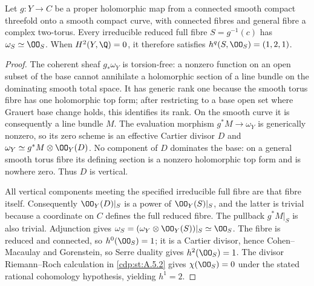 
\begin{proposition}\label{cdp:st:A.4.4}
Let $g:Y\to C$ be a proper holomorphic map from a connected smooth compact threefold onto a smooth compact curve, with connected fibres and general fibre a complex two-torus. Every irreducible reduced full fibre $S=g^{-1}(c)$ has $\omega_S\simeq\OO_S$. When $H^2(Y,\Q)=0$, it therefore satisfies $h^q(S,\OO_S)=(1,2,1)$.
\end{proposition}
\begin{proof}
The coherent sheaf $g_*\omega_Y$ is torsion-free: a nonzero function on an open subset of the base cannot annihilate a holomorphic section of a line bundle on the dominating smooth total space. It has generic rank one because the smooth torus fibre has one holomorphic top form; after restricting to a base open set where Grauert base change holds, this identifies its rank. On the smooth curve it is consequently a line bundle $M$. The evaluation morphism $g^*M\to\omega_Y$ is generically nonzero, so its zero scheme is an effective Cartier divisor $D$ and $\omega_Y\simeq g^*M\otimes\OO_Y(D)$. No component of $D$ dominates the base: on a general smooth torus fibre its defining section is a nonzero holomorphic top form and is nowhere zero. Thus $D$ is vertical.

All vertical components meeting the specified irreducible full fibre are that fibre itself. Consequently $\OO_Y(D)|_S$ is a power of $\OO_Y(S)|_S$, and the latter is trivial because a coordinate on $C$ defines the full reduced fibre. The pullback $g^*M|_S$ is also trivial. Adjunction gives $\omega_S=(\omega_Y\otimes\OO_Y(S))|_S\simeq\OO_S$. The fibre is reduced and connected, so $h^0(\OO_S)=1$; it is a Cartier divisor, hence Cohen--Macaulay and Gorenstein, so Serre duality gives $h^2(\OO_S)=1$. The divisor Riemann--Roch calculation in \ref{cdp:st:A.5.2} gives $\chi(\OO_S)=0$ under the stated rational cohomology hypothesis, yielding $h^1=2$.
\end{proof}


